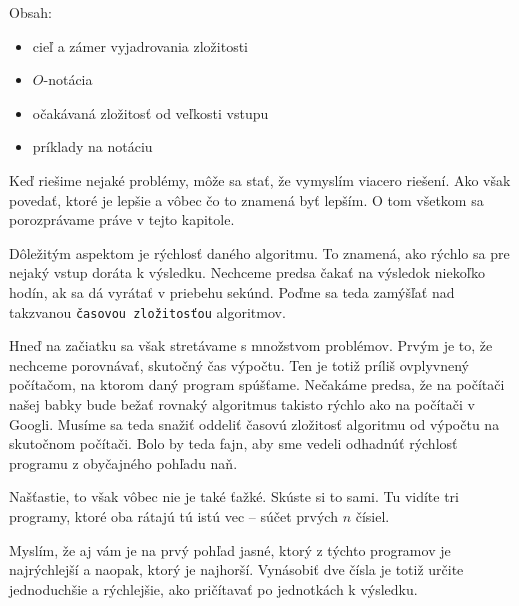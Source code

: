 %





Obsah:
\begin{itemize}
    \item cieľ a zámer vyjadrovania zložitosti
    \item $O$-notácia
    \item očakávaná zložitosť od veľkosti vstupu
    \item príklady na notáciu
\end{itemize}

Keď riešime nejaké problémy, môže sa stať, že vymyslím viacero riešení. Ako však povedať, ktoré je
lepšie a vôbec čo to znamená byť lepším. O tom všetkom sa porozprávame práve v tejto kapitole.

Dôležitým aspektom je rýchlosť daného algoritmu. To znamená, ako rýchlo sa pre nejaký vstup doráta k
výsledku. Nechceme predsa čakať na výsledok niekoľko hodín, ak sa dá vyrátať v priebehu sekúnd.
Poďme sa teda zamýšľať nad takzvanou \texttt{časovou zložitosťou} algoritmov.

Hneď na začiatku sa však stretávame s množstvom problémov. Prvým je to, že nechceme porovnávať,
skutočný čas výpočtu. Ten je totiž príliš ovplyvnený počítačom, na ktorom daný program spúšťame.
Nečakáme predsa, že na počítači našej babky bude bežať rovnaký algoritmus takisto rýchlo ako na
počítači v Googli. Musíme sa teda snažiť oddeliť časovú zložitosť algoritmu od výpočtu na skutočnom
počítači. Bolo by teda fajn, aby sme vedeli odhadnúť  rýchlosť programu z obyčajného pohľadu naň.

Našťastie, to však vôbec nie je také ťažké. Skúste si to sami. Tu vidíte tri programy, ktoré oba
rátajú tú istú vec -- súčet prvých $n$ čísiel.




Myslím, že aj vám je na prvý pohľad jasné, ktorý z týchto programov je najrýchlejší a naopak, ktorý je
najhorší. Vynásobiť dve čísla je totiž určite jednoduchšie a rýchlejšie, ako pričítavať po
jednotkách k výsledku.

